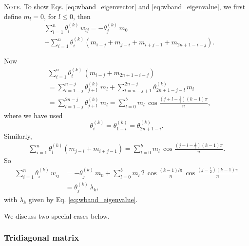 \documentclass[reprint]{revtex4-1}
\newcommand{\note}[1]{{\color{DarkGreen}\footnotesize \textsc{Note.} #1}}
\begin{document}
\note{To show Eqs.
  \eqref{eq:wband_eigenvector} and \eqref{eq:wband_eigenvalue},
  we first define $m_l = 0$, for $l \le 0$, then
$$
\begin{aligned}
&\sum_{i = 1}^n
  \theta^{(k)}_i
  \, w_{ij}
=
- \theta^{(k)}_j \, m_0
\\
&
+\sum_{i=1}^n
  \theta^{(k)}_i
  \left(
    m_{i - j} + m_{j - i} + m_{i + j - 1} + m_{2n+1-i-j}
  \right)
.
\end{aligned}
$$

Now
$$
\begin{aligned}
  &
  \sum_{i=1}^n
  \theta^{(k)}_i \,
  \left(
    m_{i - j} + m_{2n+1-i-j}
  \right)
  \\
  &=
  \sum_{l=1-j}^{n-j} \theta^{(k)}_{j+l} \, m_l
  +
  \sum_{l=n-j+1}^{2n-j} \theta^{(k)}_{2n+1-j-l} \, m_l
  \\
  &=
  \sum_{l=1-j}^{2n-j} \theta^{(k)}_{j+l} \, m_l
  =
  \sum_{l=0}^{b} m_l \, \cos\frac{(j+l-\frac12)(k-1)\pi}{n},
\end{aligned}
$$
where we have used
$$
\theta^{(k)}_i = \theta^{(k)}_{1-i} = \theta^{(k)}_{2n+1-i}.
$$
Similarly,
$$
\begin{aligned}
  \sum_{i=1}^n
  \theta^{(k)}_i
  \left(
    m_{j - i} + m_{i+j-1}
  \right)
  =
  \sum_{l=0}^{b} m_l \, \cos\frac{(j-l-\frac12)(k-1)\pi}{n}.
\end{aligned}
$$
%
So
$$
\begin{aligned}
\sum_{i = 1}^n \theta^{(k)}_i \, w_{ij}
&=
- \theta^{(k)}_j \, m_0
+\sum_{l=0}^{b} m_l \, 2 \, \cos\frac{(k-1)l\pi}{n} \, \cos\frac{(j-\frac12)(k-1)\pi}{n}
\\
&= \theta^{(k)}_j \, \lambda_k,
\end{aligned}
$$
with $\lambda_k$ given by Eq. \eqref{eq:wband_eigenvalue}.
}
%
We discuss two special cases below.



\subsubsection{Tridiagonal matrix}
\end{document}
